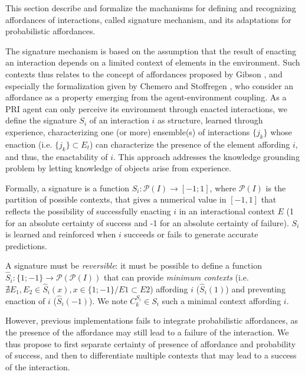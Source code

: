 \documentclass[conference]{IEEEtran}
\begin{document}
This section describe and formalize the machanisms for defining and recognizing affordances of interactions, called signature mechanism, and its adaptations for probabilistic affordances.

The signature mechanism is based on the assumption that the result of enacting an interaction depends on a limited context of elements in the environment. Such contexts thus relates to the concept of affordances proposed by Gibson \cite{gibson:affordances}, and especially the formalization given by Chemero \cite{chemero:affordance} and Stoffregen \cite{stoffregen:affordance}, who consider an affordance as a property emerging from the agent-environment coupling. As a PRI agent can only perceive its environment through enacted interactions, we define the signature $S_i$ of an interaction $i$ as structure, learned through experience, characterizing one (or more) ensemble(s) of interactions $\{j_k\}$ whose enaction (i.e. $\{j_k\} \subset E_t$) can characterize the presence of the element affording $i$, and thus, the enactability of $i$.  This approach addresses the knowledge grounding problem \cite{harnad:grounding} by letting knowledge of objects arise from experience.

Formally, a signature is a function $S_i : \mathcal{P}(I) \rightarrow [-1;1]$, where $\mathcal{P}(I)$ is the partition of possible contexts, that gives a numerical value in $[-1, 1]$ that reflects the possibility of successfully enacting $i$ in an interactional context $E$ (1 for an absolute certainty of success and -1 for an absolute certainty of failure). $S_i$ is learned and reinforced when $i$ succeeds or fails to generate accurate predictions. %

A signature must be \textit{reversible}: it must be possible to define a function $\hat{S}_i : \{1;-1\} \rightarrow \mathcal{P}(\mathcal{P}(I))$ that can provide \textit{minimum contexts} (i.e. $\nexists E_1,\!E_2\!\in\!\hat{S}_i(x), x\!\in\!\{1;-1\} / E1\!\subset\!E2$) affording $i$ ($\hat{S}_i(1)$) and preventing enaction of $i$ ($\hat{S}_i(-1)$). We note $C_k^{S_i} \in S_i$ such a minimal context affording $i$.

However, previous implementations fails to integrate probabilistic affordances, as the presence of the affordance may still lead to a failure of the interaction. We thus propose to first separate certainty of presence of affordance and probability of success, and then to differentiate multiple contexts that may lead to a success of the interaction.
\end{document}
